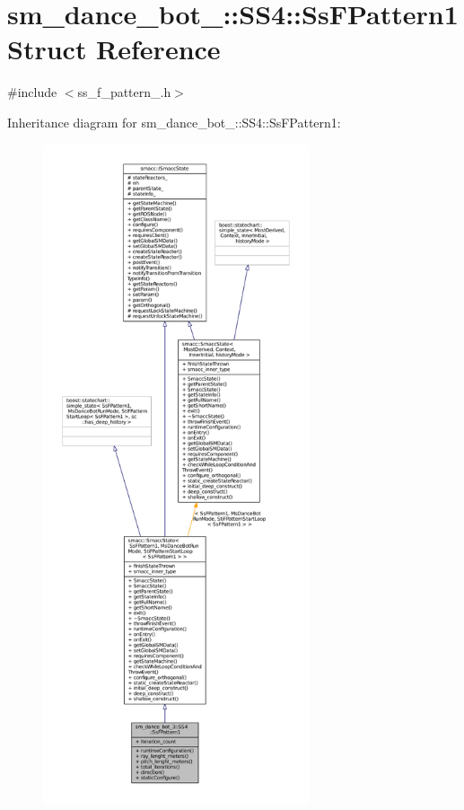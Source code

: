 \hypertarget{structsm__dance__bot__3_1_1SS4_1_1SsFPattern1}{}\section{sm\+\_\+dance\+\_\+bot\+\_\+:\+:S\+S4\+:\+:Ss\+F\+Pattern1 Struct Reference}
\label{structsm__dance__bot__3_1_1SS4_1_1SsFPattern1}


{\ttfamily \#include $<$ss\+\_\+f\+\_\+pattern\+\_.\+h$>$}



Inheritance diagram for sm\+\_\+dance\+\_\+bot\+\_\+:\+:S\+S4\+:\+:Ss\+F\+Pattern1\+:
\nopagebreak
\begin{figure}[H]
\begin{center}
\leavevmode
\includegraphics[height=550pt]{structsm__dance__bot__3_1_1SS4_1_1SsFPattern1__inherit__graph}
\end{center}
\end{figure}


